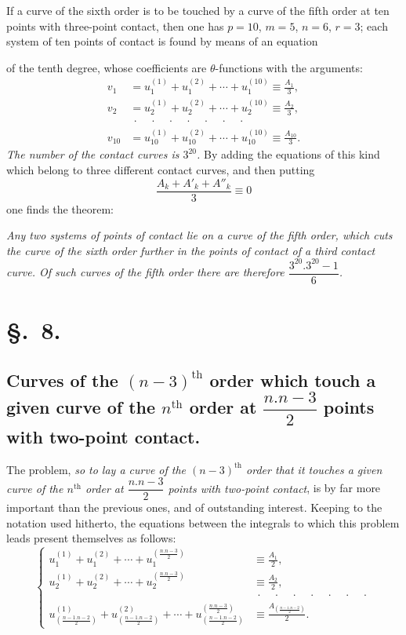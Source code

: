 \documentclass{article}
\begin{document}
If a curve of the sixth order is to be touched by a curve of the fifth order at ten points with three-point contact, then one has $p = 10$, $m = 5$, $n = 6$, $r = 3$; each system of ten points of contact is found by means of an equation

of the tenth degree, whose coefficients are $\theta$-functions with the arguments:
\[
\begin{aligned}
v_{1} &= u_{1}^{(1)} + u_{1}^{(2)} + \cdots + u_{1}^{(10)} \equiv \frac{A_{1}}{3}, \\
v_{2} &= u_{2}^{(1)} + u_{2}^{(2)} + \cdots + u_{2}^{(10)} \equiv \frac{A_{2}}{3}, \\
&\ \cdot\quad\cdot\quad\cdot\quad\cdot\quad\cdot\quad\cdot\quad\cdot \\
v_{10} &= u_{10}^{(1)} + u_{10}^{(2)} + \cdots + u_{10}^{(10)} \equiv \frac{A_{10}}{3}.
\end{aligned}
\]
\emph{The number of the contact curves is $3^{20}$.} By adding the equations of this kind which belong to three different contact curves, and then putting
\[ \frac{A_{k} + A'_{k} + A''_{k}}{3} \equiv 0 \]
one finds the theorem:

\emph{Any two systems of points of contact lie on a curve of the fifth order, which cuts the curve of the sixth order further in the points of contact of a third contact curve. Of such curves of the fifth order there are therefore $\dfrac{3^{20}.3^{20}-1}{6}$.}

\section*{§.~8.}
\subsection*{Curves of the $(n-3)^{\text{th}}$ order which touch a given curve of the $n^{\text{th}}$ order at $\dfrac{n.n-3}{2}$ points with two-point contact.}

The problem, \emph{so to lay a curve of the $(n-3)^{\text{th}}$ order that it touches a given curve of the $n^{\text{th}}$ order at $\dfrac{n.n-3}{2}$ points with two-point contact}, is by far more important than the previous ones, and of outstanding interest. Keeping to the notation used hitherto, the equations between the integrals to which this problem leads present themselves as follows:
\[
\left\{
\begin{aligned}
u_{1}^{(1)} + u_{1}^{(2)} + \cdots + u_{1}^{\left(\frac{n.n-3}{2}\right)} &\equiv \frac{A_{1}}{2}, \\
u_{2}^{(1)} + u_{2}^{(2)} + \cdots + u_{2}^{\left(\frac{n.n-3}{2}\right)} &\equiv \frac{A_{2}}{2}, \\
&\ \cdot\quad\cdot\quad\cdot\quad\cdot\quad\cdot\quad\cdot\quad\cdot \\
u_{\left(\frac{n-1.n-2}{2}\right)}^{(1)} + u_{\left(\frac{n-1.n-2}{2}\right)}^{(2)} + \cdots + u_{\left(\frac{n-1.n-2}{2}\right)}^{\left(\frac{n.n-3}{2}\right)} &\equiv \frac{A_{\left(\frac{n-1.n-2}{2}\right)}}{2}.
\end{aligned}
\right.
\tag{11.}
\]
\end{document}

